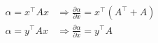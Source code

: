 \documentclass{article}
\begin{document}
\thispagestyle{empty}
\begin{align*}
\alpha = x^\top A x & \Rightarrow \frac{\partial \alpha}{\partial x} = x^\top (A^\top + A)\\
\alpha = y^\top A x & \Rightarrow \frac{\partial \alpha}{\partial x} = y^\top A\\
\end{align*}
\end{document}
